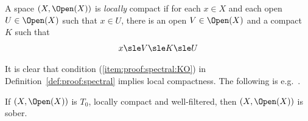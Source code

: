 A space $(X,\Open(X))$ is \emph{locally} compact
if for each $x \in X$ and each open $U \in \Open(X)$
such that $x \in U$,
there is an open $V \in \Open(X)$ and a compact $K$
such that
\[
  x \sle V \sle K \sle U
\]

It is clear that condition (\ref{item:proof:spectral:KO})
in Definition~\ref{def:proof:spectral}
implies local compactness.
The following is e.g.~\cite[Proposition~8.3.8]{goubault13book}.

\begin{proposition}
\label{prop:proof:spectral:wf-sober}
If $(X, \Open(X))$ is $T_0$, locally compact and well-filtered,
then $(X, \Open(X))$ is sober.
\end{proposition}

